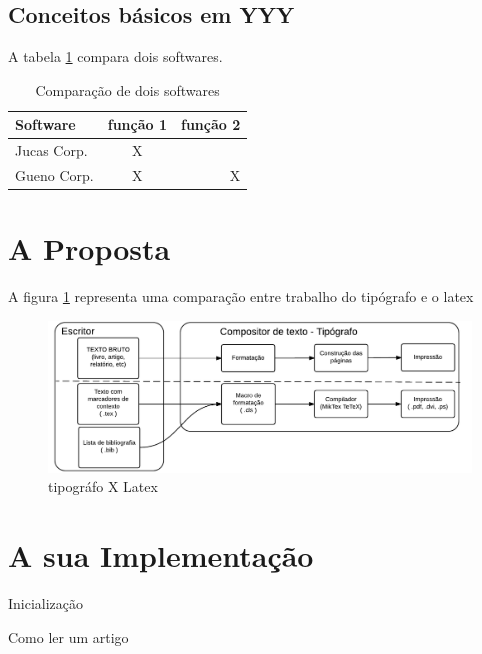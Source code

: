 \documentclass[a4paper,12pt]{article}
\begin{document}
\subsection{Conceitos básicos em YYY}
A tabela \ref{tab1} compara dois softwares.
	\begin{table}[H]
	      \begin{tabular}{| l |c |r |}
	      \hline
	        Software & função 1 & função 2 \\
	        \hline
	        Jucas Corp. & X &  \\
	        Gueno Corp. & X & X \\
	        \hline
	      \end{tabular}
	      \caption{Comparação de dois softwares}
	      \label{tab1}
	\end{table}

              
\section{A Proposta}
A figura \ref{fig1} representa uma comparação entre trabalho do tipógrafo e o latex
       \begin{figure}[H]
                \includegraphics[scale=0.63]{img/tipografovslatex.pdf}    
                \caption{tipográfo X Latex}
                \label{fig1}     
             \end{figure} 

\section{A sua Implementação}


\begin{algorithm}[H]
 Inicialização\;
 \caption{Como ler um artigo}
 \label{alg1}
\end{algorithm}
\end{document}
